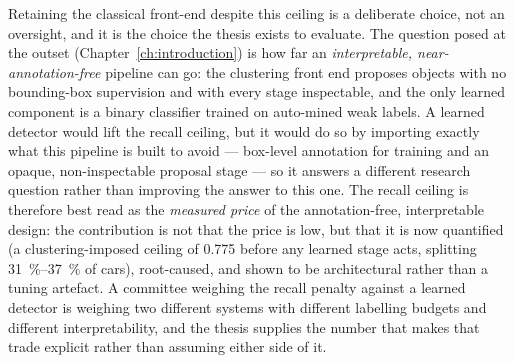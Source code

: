 Retaining the classical front-end despite this ceiling is a deliberate choice, not an
oversight, and it is the choice the thesis exists to evaluate. The question posed at the
outset (Chapter~\ref{ch:introduction}) is how far an \emph{interpretable,
near-annotation-free} pipeline can go: the clustering front end proposes objects with no
bounding-box supervision and with every stage inspectable, and the only learned component
is a binary classifier trained on auto-mined weak labels. A learned detector would lift the
recall ceiling, but it would do so by importing exactly what this pipeline is built to
avoid --- box-level annotation for training and an opaque, non-inspectable proposal
stage --- so it answers a different research question rather than improving the answer to
this one. The recall ceiling is therefore best read as the \emph{measured price} of the
annotation-free, interpretable design: the contribution is not that the price is low, but
that it is now quantified (a clustering-imposed ceiling of \num{0.775} before any learned
stage acts, splitting \SIrange{31}{37}{\percent} of cars), root-caused, and shown to be
architectural rather than a tuning artefact. A committee weighing the recall penalty
against a learned detector is weighing two different systems with different labelling
budgets and different interpretability, and the thesis supplies the number that makes that
trade explicit rather than assuming either side of it.


